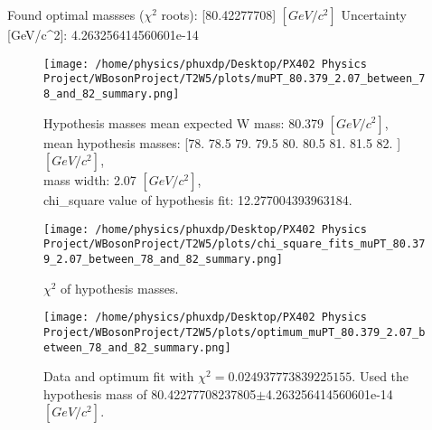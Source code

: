 \documentclass[12pt]{article}
\begin{document}
    Found optimal massses ($\chi^2$ roots): [80.42277708] $[GeV/c^{2}]$
    Uncertainty [GeV/c^2]: 4.263256414560601e-14

	\begin{figure}[tb]
		\centering
		\texttt{[image: /home/physics/phuxdp/Desktop/PX402 Physics Project/WBosonProject/T2W5/plots/muPT\_80.379\_2.07\_between\_78\_and\_82\_summary.png]}
		\caption{\small Hypothesis masses mean expected W mass: 80.379 $[GeV/c^{2}]$,\\
mean hypothesis masses: [78.  78.5 79.  79.5 80.  80.5 81.  81.5 82. ] $[GeV/c^{2}]$,\\
mass width: 2.07 $[GeV/c^{2}]$,\\
chi_square value of hypothesis fit: 12.277004393963184. }
		\label{fig: fig_0}
	\end{figure}

       \begin{figure}[tb]
		\centering
		\texttt{[image: /home/physics/phuxdp/Desktop/PX402 Physics Project/WBosonProject/T2W5/plots/chi\_square\_fits\_muPT\_80.379\_2.07\_between\_78\_and\_82\_summary.png]}
		\caption{\small $\chi^2$ of hypothesis masses. }
		\label{fig: fig_chi_square}
	\end{figure}

    \begin{figure}[tb]
		\centering
		\texttt{[image: /home/physics/phuxdp/Desktop/PX402 Physics Project/WBosonProject/T2W5/plots/optimum\_muPT\_80.379\_2.07\_between\_78\_and\_82\_summary.png]}
		\caption{\small Data and optimum fit with $\chi^2 = 0.024937773839225155$. Used the hypothesis mass of 80.42277708237805$\pm$4.263256414560601e-14 $[GeV/c^{2}]$. }
		\label{fig: fig_optim_parms}
	\end{figure}
    
\end{document}
